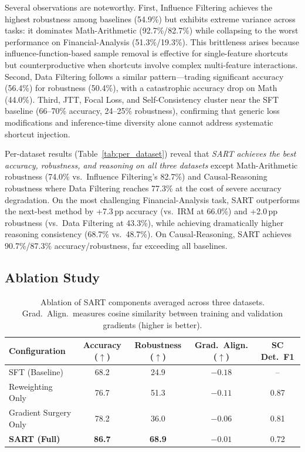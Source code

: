 Several observations are noteworthy.
First, Influence Filtering achieves the highest robustness among baselines (54.9\%) but exhibits extreme variance across tasks: it dominates Math-Arithmetic (92.7\%/82.7\%) while collapsing to the worst performance on Financial-Analysis (51.3\%/19.3\%). This brittleness arises because influence-function-based sample removal is effective for single-feature shortcuts but counterproductive when shortcuts involve complex multi-feature interactions.
Second, Data Filtering follows a similar pattern---trading significant accuracy (56.4\%) for robustness (50.4\%), with a catastrophic accuracy drop on Math (44.0\%).
Third, JTT, Focal Loss, and Self-Consistency cluster near the SFT baseline (66--70\% accuracy, 24--25\% robustness), confirming that generic loss modifications and inference-time diversity alone cannot address systematic shortcut injection.

Per-dataset results (Table~\ref{tab:per_dataset}) reveal that \emph{SART achieves the best accuracy, robustness, and reasoning on all three datasets} except Math-Arithmetic robustness (74.0\% vs.\ Influence Filtering's 82.7\%) and Causal-Reasoning robustness where Data Filtering reaches 77.3\% at the cost of severe accuracy degradation. On the most challenging Financial-Analysis task, SART outperforms the next-best method by +7.3\,pp accuracy (vs.\ IRM at 66.0\%) and +2.0\,pp robustness (vs.\ Data Filtering at 43.3\%), while achieving dramatically higher reasoning consistency (68.7\% vs.\ 48.7\%). On Causal-Reasoning, SART achieves 90.7\%/87.3\% accuracy/robustness, far exceeding all baselines.

\subsection{Ablation Study}
\label{sec:exp_ablation}

\begin{table}[t]
\centering
\caption{Ablation of SART components averaged across three datasets. Grad.\ Align.\ measures cosine similarity between training and validation gradients (higher is better).}
\label{tab:ablation}
\small
\begin{tabular}{lcccc}
\toprule
\textbf{Configuration} & \textbf{Accuracy} ($\uparrow$) & \textbf{Robustness} ($\uparrow$) & \textbf{Grad.\ Align.} ($\uparrow$) & \textbf{SC Det.\ F1} \\
\midrule
SFT (Baseline)              & 68.2 & 24.9  & $-0.18$ & -- \\
\midrule
Reweighting Only            & 76.7 & 51.3  & $-0.11$ & 0.87 \\
Gradient Surgery Only       & 78.2 & 36.0  & $-0.06$ & 0.81 \\
\textbf{SART (Full)}        & \textbf{86.7} & \textbf{68.9}  & $\mathbf{-0.01}$ & 0.72 \\
\bottomrule
\end{tabular}
\end{table}

